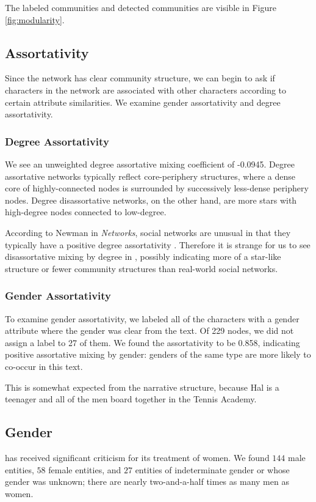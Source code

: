 The labeled communities and detected communities are visible in Figure \ref{fig:modularity}.

\subsection{Assortativity}
Since the network has clear community structure, we can begin to ask if characters in the network are associated with other characters according to certain attribute similarities. We examine gender assortativity and degree assortativity.

\subsubsection{Degree Assortativity}
We see an unweighted degree assortative mixing coefficient of -0.0945.
Degree assortative networks typically reflect core-periphery structures, where a dense core of highly-connected nodes is surrounded by successively less-dense periphery nodes. Degree disassortative networks, on the other hand, are more stars with high-degree nodes connected to low-degree. 

According to Newman in {\em Networks}, social networks are unusual in that they typically have a positive degree assortativity \cite{NewmanBook}. 
Therefore it is strange for us to see disassortative mixing by degree in \infinitejest, possibly indicating more of a star-like structure or fewer community structures than real-world social networks.

\subsubsection{Gender Assortativity}
To examine gender assortativity, we labeled all of the characters with a gender attribute where the gender was clear from the text. Of 229 nodes, we did not assign a label to 27 of them. We found the assortativity to be 0.858, indicating positive assortative mixing by gender: genders of the same type are more likely to co-occur in this text. 

This is somewhat expected from the narrative structure, because Hal is a teenager and all of the men board together in the Tennis Academy.

\subsection{Gender}

\infinitejest has received significant criticism for its treatment of women.\cite{hayes-brady_2017} We found $144$ male entities, $58$ female entities, and $27$ entities of indeterminate gender or whose gender was unknown; there are nearly two-and-a-half times as many men as women.

